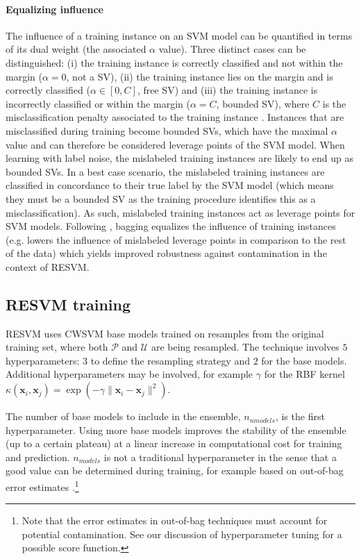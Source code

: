 \documentclass[preprint,elsarticle-num,12pt]{elsarticle}
\begin{document}
\paragraph{Equalizing influence} The influence of a training instance on an SVM model can be quantified in terms of its dual weight (the associated $\alpha$ value). Three distinct cases can be distinguished: (i) the training instance is correctly classified and not within the margin ($\alpha = 0$, not a SV), (ii) the training instance lies on the margin and is correctly classified ($\alpha \in [0, C]$, free SV) and (iii) the training instance is incorrectly classified or within the margin ($\alpha = C$, bounded SV), where $C$ is the misclassification penalty associated to the training instance \citep{bottou2007support}. Instances that are misclassified during training become bounded SVs, which have the maximal $\alpha$ value and can therefore be considered leverage points of the SVM model. When learning with label noise, the mislabeled training instances are likely to end up as bounded SVs. In a best case scenario, the mislabeled training instances are classified in concordance to their true label by the SVM model (which means they must be a bounded SV as the training procedure identifies this as a misclassification). As such, mislabeled training instances act as leverage points for SVM models. Following \citet{grandvalet2004bagging}, bagging equalizes the influence of training instances (e.g. lowers the influence of mislabeled leverage points in comparison to the rest of the data) which yields improved robustness against contamination in the context of RESVM. 


\subsection{RESVM training}
RESVM uses CWSVM base models trained on resamples from the original training set, where both $\mathcal{P}$ and $\mathcal{U}$ are being resampled. The technique involves $5$ hyperparameters: $3$ to define the resampling strategy and $2$ for the base models. Additional hyperparameters may be involved, for example $\gamma$ for the RBF kernel $\kappa(\mathbf{x}_i, \mathbf{x}_j) = \exp(-\gamma \| \mathbf{x}_i-\mathbf{x}_j\|^2)$.

The number of base models to include in the ensemble, $n_{nmodels}$, is the first hyperparameter. Using more base models improves the stability of the ensemble (up to a certain plateau) at a linear increase in computational cost for training and prediction. $n_{models}$ is not a traditional hyperparameter in the sense that a good value can be determined during training, for example based on out-of-bag error estimates \citep{banfield2007comparison}.\footnote{\label{labelednote}Note that the error estimates in out-of-bag techniques must account for potential contamination. See our discussion of hyperparameter tuning for a possible score function.}
\end{document}
